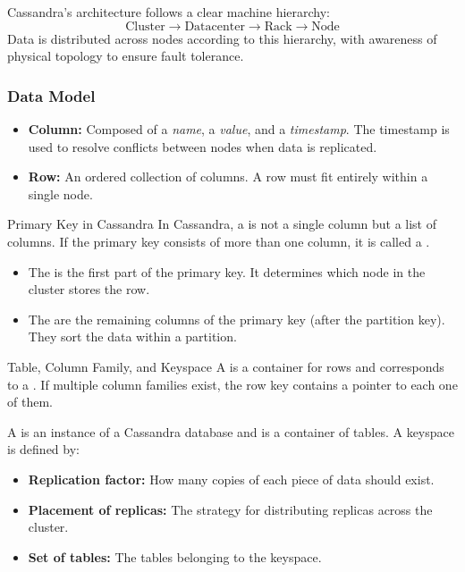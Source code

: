 Cassandra's architecture follows a clear machine hierarchy:
\[
\text{Cluster} \to \text{Datacenter} \to \text{Rack} \to \text{Node}
\]
Data is distributed across nodes according to this hierarchy, with awareness of physical topology to ensure fault tolerance.

\subsubsection{Data Model}

\begin{itemize}
    \item \textbf{Column:} Composed of a \emph{name}, a \emph{value}, and a \emph{timestamp}. The timestamp is used to resolve conflicts between nodes when data is replicated.
    \item \textbf{Row:} An ordered collection of columns. A row must fit entirely within a single node.
\end{itemize}

\begin{definition}{Primary Key in Cassandra}
    In Cassandra, a  is not a single column but a list of columns. If the primary key consists of more than one column, it is called a .
    \begin{itemize}
        \item The  is the first part of the primary key. It determines which node in the cluster stores the row.
        \item The  are the remaining columns of the primary key (after the partition key). They sort the data within a partition.
    \end{itemize}
\end{definition}

\begin{definition}{Table, Column Family, and Keyspace}
    A  is a container for rows and corresponds to a . If multiple column families exist, the row key contains a pointer to each one of them.

    A  is an instance of a Cassandra database and is a container of tables. A keyspace is defined by:
    \begin{itemize}
        \item \textbf{Replication factor:} How many copies of each piece of data should exist.
        \item \textbf{Placement of replicas:} The strategy for distributing replicas across the cluster.
        \item \textbf{Set of tables:} The tables belonging to the keyspace.
    \end{itemize}
\end{definition}

